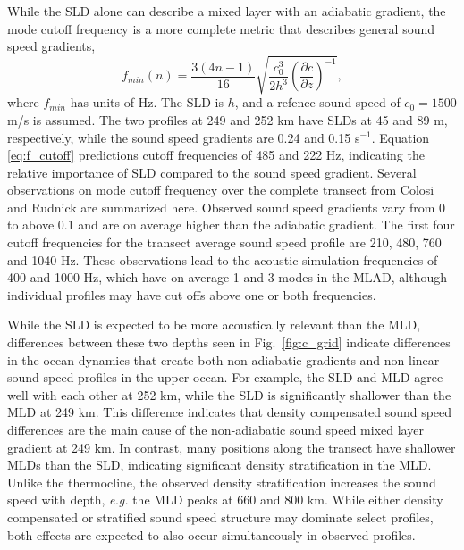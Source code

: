 \documentclass[preprint,NumberedRefs]{JASA}
\begin{document}
While the SLD alone can describe a mixed layer with an adiabatic gradient, the mode cutoff frequency\citep{Urick1982Prop} is a more complete metric that describes general sound speed gradients,
\begin{equation}
    f_{min}(n) = \frac{3(4n-1)}{16} \sqrt{\frac{c_0^3}{2h^3} \left( \frac{\partial c}{\partial z} \right) ^ {-1}},
    \label{eq:f_cutoff}
\end{equation}
where $f_{min}$ has units of Hz. The SLD is $h$, and a refence sound speed of $c_0 = 1500$ m/s is assumed. The two profiles at 249 and 252 km have SLDs at 45 and 89 m, respectively, while the sound speed gradients are 0.24 and 0.15 s$^{-1}$. Equation \eqref{eq:f_cutoff} predictions cutoff frequencies of 485 and 222 Hz, indicating the relative importance of SLD compared to the sound speed gradient. Several observations on mode cutoff frequency over the complete transect from Colosi and Rudnick\cite{colosi2020observations} are summarized here. Observed sound speed gradients vary from 0 to above 0.1 and are on average higher than the adiabatic gradient. The first four cutoff frequencies for the transect average sound speed profile are 210, 480, 760 and 1040 Hz. These observations lead to the acoustic simulation frequencies of 400 and 1000 Hz, which have on average 1 and 3 modes in the MLAD, although individual profiles may have cut offs above one or both frequencies.

While the SLD is expected to be more acoustically relevant than the MLD, differences between these two depths seen in Fig.~\ref{fig:c_grid} indicate differences in the ocean dynamics that create both non-adiabatic gradients and non-linear sound speed profiles in the upper ocean. For example, the SLD and MLD agree well with each other at 252 km, while the SLD is significantly shallower than the MLD at 249 km. This difference indicates that density compensated sound speed differences are the main cause of the non-adiabatic sound speed mixed layer gradient at 249 km. In contrast, many positions along the transect have shallower MLDs than the SLD, indicating significant density stratification in the MLD. Unlike the thermocline, the observed density stratification increases the sound speed with depth, \emph{e.g.} the MLD peaks at 660 and 800 km. While either density compensated or stratified sound speed structure may dominate select profiles, both effects are expected to also occur simultaneously in observed profiles.
\end{document}
